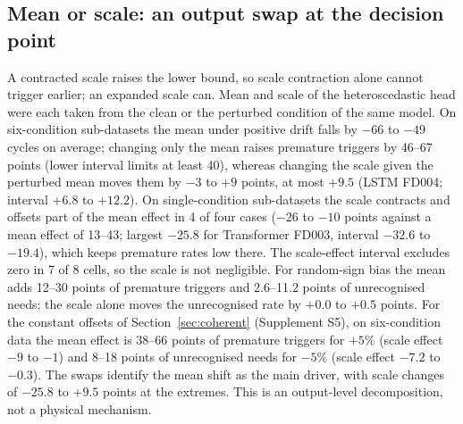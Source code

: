\documentclass[11pt,a4paper]{article}
\newcommand{\JSwapMuDrift}{46--67}
\newcommand{\JSwapMuDriftLoCI}{40}
\newcommand{\JSwapSigDrift}{-3$ to $+9}
\newcommand{\JMuShiftDrift}{-66$ to $-49}
\newcommand{\JSwapMuDriftSingle}{13--43}
\newcommand{\JSwapSigDriftSingle}{-26$ to $-10}
\newcommand{\JSwapSigDriftSingleN}{4}
\newcommand{\JSwapMuBias}{12--30}
\newcommand{\JSwapMuBiasUnrec}{2.6--11.2}
\newcommand{\JSwapSigBiasUnrec}{+0.0$ to $+0.5}
\newcommand{\JSigExtMaxCell}{LSTM FD004}
\newcommand{\JSigExtMaxPt}{$+9.5$}
\newcommand{\JSigExtMaxLo}{$+6.8$}
\newcommand{\JSigExtMaxHi}{$+12.2$}
\newcommand{\JSigExtMinCell}{Transformer FD003}
\newcommand{\JSigExtMinPt}{$-25.8$}
\newcommand{\JSigExtMinLo}{$-32.6$}
\newcommand{\JSigExtMinHi}{$-19.4$}
\newcommand{\JSigExtExclZero}{7}
\newcommand{\JSigExtCells}{8}
\newcommand{\JCNswapMuUnrec}{8--18}
\newcommand{\JCNswapSigUnrec}{$-7.2$ to $-0.3$}
\newcommand{\JCPswapMuPrem}{38--66}
\newcommand{\JCPswapSigPrem}{$-9$ to $-1$}
\begin{document}
\subsection{Mean or scale: an output swap at the decision point}\label{sec:swap}
A contracted scale raises the lower bound, so scale contraction alone cannot trigger earlier; an expanded scale can. Mean and scale of the heteroscedastic head were each taken from the clean or the perturbed condition of the same model. On six-condition sub-datasets the mean under positive drift falls by $\JMuShiftDrift$ cycles on average; changing only the mean raises premature triggers by \JSwapMuDrift{} points (lower interval limits at least \JSwapMuDriftLoCI{}), whereas changing the scale given the perturbed mean moves them by $\JSwapSigDrift$ points, at most \JSigExtMaxPt{} (\JSigExtMaxCell; interval \JSigExtMaxLo{} to \JSigExtMaxHi). On single-condition sub-datasets the scale contracts and offsets part of the mean effect in \JSwapSigDriftSingleN{} of four cases ($\JSwapSigDriftSingle$ points against a mean effect of \JSwapMuDriftSingle{}; largest \JSigExtMinPt{} for \JSigExtMinCell, interval \JSigExtMinLo{} to \JSigExtMinHi), which keeps premature rates low there. The scale-effect interval excludes zero in \JSigExtExclZero{} of \JSigExtCells{} cells, so the scale is not negligible. For random-sign bias the mean adds \JSwapMuBias{} points of premature triggers and \JSwapMuBiasUnrec{} points of unrecognised needs; the scale alone moves the unrecognised rate by $\JSwapSigBiasUnrec$ points. For the constant offsets of Section~\ref{sec:coherent} (Supplement S5), on six-condition data the mean effect is \JCPswapMuPrem{} points of premature triggers for $+5\%$ (scale effect \JCPswapSigPrem) and \JCNswapMuUnrec{} points of unrecognised needs for $-5\%$ (scale effect \JCNswapSigUnrec). The swaps identify the mean shift as the main driver, with scale changes of \JSigExtMinPt{} to \JSigExtMaxPt{} points at the extremes. This is an output-level decomposition, not a physical mechanism.
\end{document}
